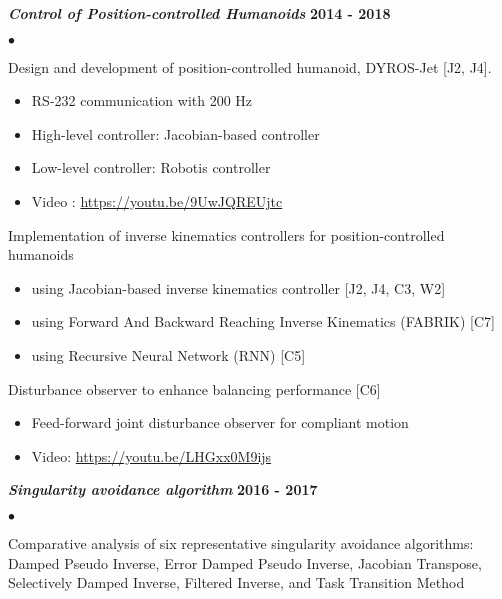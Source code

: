 \documentclass[margin,line]{res}
\newenvironment{list2}{
  \begin{list}{$\bullet$}{%
      \setlength{\itemsep}{0in}
      \setlength{\parsep}{0in} \setlength{\parskip}{0in}
      \setlength{\topsep}{0in} \setlength{\partopsep}{0in} 
      \setlength{\leftmargin}{0.2in}}}{\end{list}}
\begin{document}
\begin{resume}
\textbf{\emph { Control of Position-controlled Humanoids}} \hfill {\bf 2014  - 2018}
\begin{list2}
\item Design and development of position-controlled humanoid, DYROS-Jet [J2, J4].
\begin{itemize}
\vspace*{-.05in}
\item[\checkmark] RS-232 communication with 200 Hz
\vspace*{-.05in}
\item[\checkmark] High-level controller: Jacobian-based controller
\vspace*{-.05in}
\item[\checkmark] Low-level controller: Robotis controller
\vspace*{-.05in}
\item[\checkmark] Video : \url{https://youtu.be/9UwJQREUjtc}
\vspace*{-.05in}
\end{itemize}
\item Implementation of inverse kinematics controllers for position-controlled humanoids
\begin{itemize}
\vspace*{-.05in}
\item[\checkmark] using Jacobian-based inverse kinematics controller [J2, J4, C3, W2]
\vspace*{-.05in}
\item[\checkmark] using Forward And Backward Reaching Inverse Kinematics (FABRIK) [C7]
\vspace*{-.05in}
\item[\checkmark] using Recursive Neural Network (RNN) [C5]
\vspace*{-.05in}
\end{itemize}
\item Disturbance observer to enhance balancing performance [C6]
\begin{itemize}
\vspace*{-.05in}
\item[\checkmark] Feed-forward joint disturbance observer for compliant motion
\vspace*{-.05in}
\item[\checkmark] Video:  \url{https://youtu.be/LHGxx0M9ijs}
\vspace*{-.05in}
\end{itemize}
\end{list2}


\textbf{\emph {Singularity avoidance algorithm}} \hfill {\bf 2016  - 2017}
\begin{list2}
\item Comparative analysis of six representative singularity avoidance algorithms:
\\ Damped Pseudo Inverse, Error Damped Pseudo Inverse, Jacobian Transpose, Selectively Damped Inverse, Filtered Inverse, and Task Transition Method
\end{list2}


\end{resume}
\end{document}

